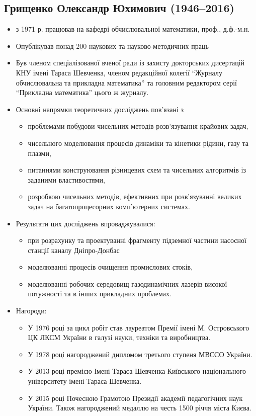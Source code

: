 \subsection{Грищенко Олександр Юхимович (1946--2016)}
\begin{itemize}
    \item з 1971 р. працював на кафедрі обчислювальної математики, проф., д.ф.-м.н.
    \item Опублікував понад 200 наукових та науково-методичних праць 
    \item Був членом спеціалізованої вченої ради із захисту докторських дисертацій КНУ імені Тараса Шевченка,  членом редакційної колегії ``Журналу обчислювальна та прикладна математика'' та головним редактором серії ``Прикладна математика'' цього ж журналу.
    \item Основні напрямки теоретичних досліджень пов'язані з 
    \begin{itemize}
        \item проблемами  побудови чисельних методів розв'язування крайових задач, 
        \item чисельного моделювання процесів динаміки та кінетики рідини, газу та плазми, 
        \item питаннями конструювання різницевих схем та чисельних алгоритмів із заданими властивостями, 
        \item розробкою чисельних методів, ефективних при розв'язуванні великих задач на багатопроцесорних комп'ютерних системах.
    \end{itemize}
    \item Результати цих досліджень впроваджувалися:
    \begin{itemize}
        \item при розрахунку та проектуванні фрагменту підземної частини насосної станції каналу Дніпро-Донбас
        \item моделюванні процесів очищення промислових стоків, 
        \item моделюванні робочих середовищ газодинамічних лазерів високої потужності та в інших прикладних проблемах.
    \end{itemize}
    \item Нагороди:
    \begin{itemize}
        \item У 1976 році за цикл робіт став лауреатом Премії імені М. Островського ЦК ЛКСМ України в галузі науки, техніки та виробництва.
        \item У 1978 році нагороджений дипломом третього ступеня МВССО України.
        \item У 2013 році премією Імені Тараса Шевченка Київського національного університету імені Тараса Шевченка.
        \item У 2015 році Почесною Грамотою Президії академії педагогічних наук \allowbreak України. Також нагороджений медаллю на честь 1500 річчя міста Києва.
    \end{itemize}
\end{itemize}
\newpage
